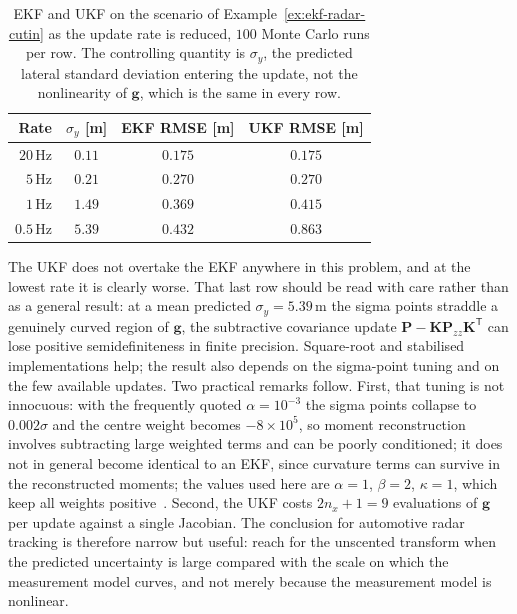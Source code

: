 \begin{example}
\begin{table}[!t]
\centering
\small
\caption{EKF and UKF on the scenario of
Example~\ref{ex:ekf-radar-cutin} as the update rate is reduced, $100$ Monte
Carlo runs per row. The controlling quantity is $\sigma_y$, the predicted
lateral standard deviation entering the update, not the nonlinearity of
$\mathbf{g}$, which is the same in every row.}
\label{tab:ekf-ukf-rate}
\begin{tabular}{r c c c}
\hline
\textbf{Rate} & \textbf{$\sigma_y$ [m]} & \textbf{EKF RMSE [m]} & \textbf{UKF RMSE [m]}\\
\hline
$20$\,Hz & $0.11$ & $0.175$ & $0.175$\\
$5$\,Hz & $0.21$ & $0.270$ & $0.270$\\
$1$\,Hz & $1.49$ & $0.369$ & $0.415$\\
$0.5$\,Hz & $5.39$ & $0.432$ & $0.863$\\
\hline
\end{tabular}
\end{table}

The UKF does not overtake the EKF anywhere in this problem, and at the lowest
rate it is clearly worse. That last row should be read with care rather than
as a general result: at a mean predicted $\sigma_y=5.39$\,m the sigma points straddle a genuinely
curved region of $\mathbf{g}$, the subtractive covariance update $\mathbf{P}-\mathbf{K}\mathbf{P}_{zz}\mathbf{K}^{\mathsf T}$ can lose positive semidefiniteness in finite precision. Square-root and stabilised implementations help; the result also depends on the sigma-point tuning and on the few available updates. Two
practical remarks follow. First, that tuning is not innocuous: with the
frequently quoted $\alpha=10^{-3}$ the sigma points collapse to $0.002\sigma$
and the centre weight becomes $-8\times10^{5}$, so moment reconstruction involves subtracting large weighted terms and can be poorly conditioned; it does not in general become identical to an EKF, since curvature terms can survive in the reconstructed moments; the values used here are
$\alpha=1$, $\beta=2$, $\kappa=1$, which keep all weights
positive~\cite{julier2004_ukf}. Second, the UKF costs $2n_x+1=9$ evaluations of
$\mathbf{g}$ per update against a single Jacobian. The conclusion for
automotive radar tracking is therefore narrow but useful: reach for the
unscented transform when the predicted uncertainty is large compared with the
scale on which the measurement model curves, and not merely because the
measurement model is nonlinear.
\end{example}







